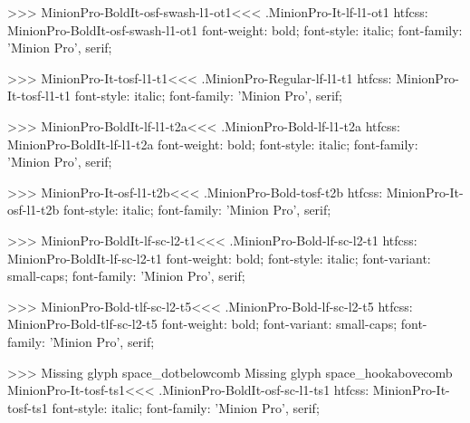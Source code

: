 {>>>
\<MinionPro-BoldIt-osf-swash-l1-ot1\><<<
.MinionPro-It-lf-l1-ot1
htfcss:  MinionPro-BoldIt-osf-swash-l1-ot1  font-weight: bold; font-style: italic; font-family: 'Minion Pro', serif;

>>>
\<MinionPro-It-tosf-l1-t1\><<<
.MinionPro-Regular-lf-l1-t1
htfcss:  MinionPro-It-tosf-l1-t1  font-style: italic; font-family: 'Minion Pro', serif;

>>>
\<MinionPro-BoldIt-lf-l1-t2a\><<<
.MinionPro-Bold-lf-l1-t2a
htfcss:  MinionPro-BoldIt-lf-l1-t2a  font-weight: bold; font-style: italic; font-family: 'Minion Pro', serif;

>>>
\<MinionPro-It-osf-l1-t2b\><<<
.MinionPro-Bold-tosf-t2b
htfcss:  MinionPro-It-osf-l1-t2b  font-style: italic; font-family: 'Minion Pro', serif;

>>>
\<MinionPro-BoldIt-lf-sc-l2-t1\><<<
.MinionPro-Bold-lf-sc-l2-t1
htfcss:  MinionPro-BoldIt-lf-sc-l2-t1  font-weight: bold; font-style: italic; font-variant: small-caps; font-family: 'Minion Pro', serif;

>>>
\<MinionPro-Bold-tlf-sc-l2-t5\><<<
.MinionPro-Bold-lf-sc-l2-t5
htfcss:  MinionPro-Bold-tlf-sc-l2-t5  font-weight: bold; font-variant: small-caps; font-family: 'Minion Pro', serif;

>>>
Missing glyph	space_dotbelowcomb
Missing glyph	space_hookabovecomb
\<MinionPro-It-tosf-ts1\><<<
.MinionPro-BoldIt-osf-sc-l1-ts1
htfcss:  MinionPro-It-tosf-ts1  font-style: italic; font-family: 'Minion Pro', serif;

}
